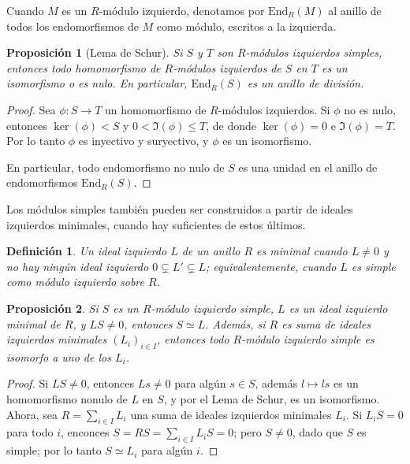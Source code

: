 \documentclass{article}
\newtheorem{definition}{Definición}[section]
\newtheorem{proposition}{Proposición}[section]
\newcommand{\End}{\text{End}}
\begin{document}
Cuando $M$ es un $R$-módulo izquierdo, denotamos por $\End_R(M)$ al anillo de todos los endomorfismos de $M$ como módulo, escritos a la izquierda.

\begin{proposition}[Lema de Schur]
    Si $S$ y $T$ son $R$-módulos izquierdos simples, entonces todo homomorfismo de $R$-módulos izquierdos de $S$ en $T$ es un isomorfismo o es nulo. En particular, $\End_R(S)$ es un anillo de división.
\end{proposition}

\begin{proof}
    Sea $\phi: S \to T$ un homomorfismo de $R$-módulos izquierdos.
    Si $\phi$ no es nulo, entonces $\ker(\phi) < S$ y $0 < \Im(\phi) \leq T$, de donde $\ker(\phi) = 0$ e $\Im(\phi) = T$.
    Por lo tanto $\phi$ es inyectivo y suryectivo, y $\phi$ es un isomorfismo.

    En particular, todo endomorfismo no nulo de $S$ es una unidad en el anillo de endomorfismos $\End_R(S)$.
\end{proof}

Los módulos simples también pueden ser construidos a partir de ideales izquierdos minimales, cuando hay suficientes de estos últimos.

\begin{definition}
    Un ideal izquierdo $L$ de un anillo $R$ es minimal cuando $L \neq 0$ y no hay ningún ideal izquierdo $0 \subsetneq L' \subsetneq L$; equivalentemente, cuando $L$ es simple como módulo izquierdo sobre $R$.
\end{definition}

\begin{proposition}
    Si $S$ es un $R$-módulo izquierdo simple, $L$ es un ideal izquierdo minimal de $R$, y $L S \neq 0$, entonces $S \simeq L$.
    Además, si $R$ es suma de ideales izquierdos minimales $(L_i)_{i \in I}$, entonces todo $R$-módulo izquierdo simple es isomorfo a uno de los $L_i$.
\end{proposition}

\begin{proof}
    Si $LS \neq 0$, entonces $Ls \neq 0$ para algún $s \in S$, además $l \mapsto ls$ es un homomorfismo nonulo de $L$ en $S$, y por el Lema de Schur, es un isomorfismo.
    Ahora, sea $R = \sum_{i \in I} L_i$ una suma de ideales izquierdos minimales $L_i$.
    Si $L_i S = 0$ para todo $i$, enconces $S = RS = \sum_{i \in I} L_i S = 0$; pero $S \neq 0$, dado que $S$ es simple; por lo tanto $S \simeq L_i$ para algún $i$.
\end{proof}
\end{document}
